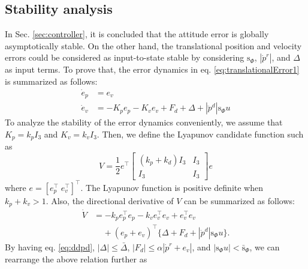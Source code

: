 \documentclass[letterpaper, 10 pt, conference]{ieeeconf}  %
\begin{document}
\subsection{Stability analysis}
In Sec. \ref{sec:controller}, it is concluded that the attitude error is globally asymptotically stable.
On the other hand, the translational position and velocity errors could be considered as input-to-state stable by considering $\text{s}_\Phi$, $|\dot{p}^r|$, and $\Delta$ as input terms. 
To prove that, the error dynamics in eq. \eqref{eq:translationalError1} is summarized as follows: 
\begin{align}
\dot{e}_p &= e_v \nonumber \\
\dot{e}_v &= -K_pe_p-K_ve_v+F_d+\Delta+|\ddot{p}^d|\text{s}_\Phi u \nonumber
\end{align}
To analyze the stability of the error dynamics conveniently, we assume that $K_p = k_pI_3$ and $K_v = k_vI_3$. Then, we define the Lyapunov candidate function such as
\begin{equation}
V = \frac{1}{2} e^\top 
\left[
\begin{array}{rr}
(k_p+k_d)I_3 & I_3 \\ I_3 & I_3
\end{array}
\right]e \nonumber
\end{equation}
where $e = [e_p^\top\;e_v^\top]^\top$. The Lyapunov function is positive definite when $k_p + k_v > 1$.
Also, the directional derivative of $V$ can be summarized as follows:
\begin{align}
\dot{V} &= -k_p e_p^\top e_p -k_v e_v^\top e_v + e_v^\top e_v \nonumber \\
&\;\;\;\;+(e_p+e_v)^\top\{\Delta + F_d + |\ddot{p}^d|\text{s}_\Phi u\}.
\end{align}
By having eq. \eqref{eq:ddpd}, $|\Delta|\leq\bar{\Delta}$, $|F_d| \leq \alpha|\dot{p}^r+e_v|$, and $|\text{s}_\Phi u| < \bar{\text{s}}_\Phi$, we can rearrange the above relation further as
\end{document}
